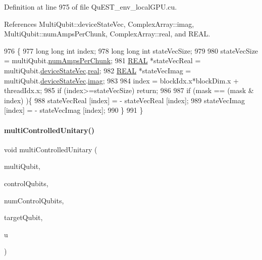 Definition at line 975 of file Qu\+E\+S\+T\+\_\+env\+\_\+local\+G\+P\+U.\+cu.



References Multi\+Qubit\+::device\+State\+Vec, Complex\+Array\+::imag, Multi\+Qubit\+::num\+Amps\+Per\+Chunk, Complex\+Array\+::real, and R\+E\+AL.


\begin{DoxyCode}
976 \{
977     \textcolor{keywordtype}{long} \textcolor{keywordtype}{long} \textcolor{keywordtype}{int} index;
978     \textcolor{keywordtype}{long} \textcolor{keywordtype}{long} \textcolor{keywordtype}{int} stateVecSize;
979 
980     stateVecSize = multiQubit.\mbox{\hyperlink{structMultiQubit_a1cad83601a78635dd278259c7ed54f18}{numAmpsPerChunk}};
981     \mbox{\hyperlink{QuEST__precision_8h_a4b654506f18b8bfd61ad2a29a7e38c25}{REAL}} *stateVecReal = multiQubit.\mbox{\hyperlink{structMultiQubit_a59ac613486a41b8c9a4b6e79cc8d2cc3}{deviceStateVec}}.\mbox{\hyperlink{structComplexArray_a4195cac6c784ea1b6271f1c7dba1548a}{real}};
982     \mbox{\hyperlink{QuEST__precision_8h_a4b654506f18b8bfd61ad2a29a7e38c25}{REAL}} *stateVecImag = multiQubit.\mbox{\hyperlink{structMultiQubit_a59ac613486a41b8c9a4b6e79cc8d2cc3}{deviceStateVec}}.\mbox{\hyperlink{structComplexArray_a79dde47c7ae530c79cebfdf57b225968}{imag}};
983 
984     index = blockIdx.x*blockDim.x + threadIdx.x;
985     \textcolor{keywordflow}{if} (index>=stateVecSize) \textcolor{keywordflow}{return};
986 
987     \textcolor{keywordflow}{if} (mask == (mask & index) )\{
988         stateVecReal [index] = - stateVecReal [index];
989         stateVecImag [index] = - stateVecImag [index];
990     \}
991 \}
\end{DoxyCode}
\mbox{\label{QuEST__env__localGPU_8cu_aa29551d2d5c883891faa75a4741dc71a}} 
\paragraph{\texorpdfstring{multi\+Controlled\+Unitary()}{multiControlledUnitary()}}
{\footnotesize\ttfamily void multi\+Controlled\+Unitary (\begin{DoxyParamCaption}\item[{\mbox{\hyperlink{structMultiQubit}{Multi\+Qubit}}}]{multi\+Qubit,  }\item[{int $\ast$}]{control\+Qubits,  }\item[{const int}]{num\+Control\+Qubits,  }\item[{const int}]{target\+Qubit,  }\item[{\mbox{\hyperlink{structComplexMatrix2}{Complex\+Matrix2}}}]{u }\end{DoxyParamCaption})}



